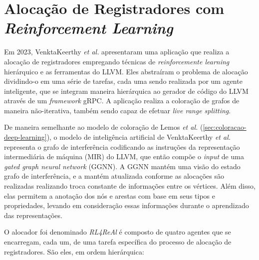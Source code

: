\documentclass[
	12pt,				%
	openright,			%
	oneside,			%
	a4paper,			%
	tccpreliminar,			%
	]{ABNT-DC-UEL}
\begin{document}
\section{Alocação de Registradores com \textit{Reinforcement Learning}}

Em 2023, VenktaKeerthy \textit{et al.} \cite{venkatakeerthy:23} apresentaram uma aplicação que realiza a alocação de registradores empregando técnicas de \textit{reinforcemente learning} hierárquico e as ferramentas do LLVM. Eles abstraíram o problema de alocação dividindo-o em uma série de tarefas, cada uma sendo realizada por um agente inteligente, que se integram maneira hierárquica ao gerador de código do LLVM através de um \textit{framework} gRPC. A aplicação realiza a coloração de grafos de maneira não-iterativa, também sendo capaz de efetuar \textit{live range splitting}.

De maneira semelhante ao modelo de coloração de Lemos \textit{et al.} \cite{lemos:19} (\ref{sec:coloracao-deep-learning}), o modelo de inteligência artificial de VenktaKeerthy \textit{et al.} \cite{venkatakeerthy:23} representa o grafo de interferência codificando as instruções da representação intermediária de máquina (MIR) do LLVM, que então compõe o \textit{input} de uma \textit{gated graph neural network} (GGNN). A GGNN mantém uma visão do estado grafo de interferência, e a mantém atualizada conforme as alocações são realizadas realizando troca constante de informações entre os vértices. Além disso, elas permitem a anotação dos nós e arestas com base em seus tipos e propriedades, levando em consideração essas informações durante o aprendizado das representações.

O alocador foi denominado \textit{RL4ReAl} é composto de quatro agentes que se encarregam, cada um, de uma tarefa específica do processo de alocação de registradores. São eles, em ordem hierárquica:
\end{document}
